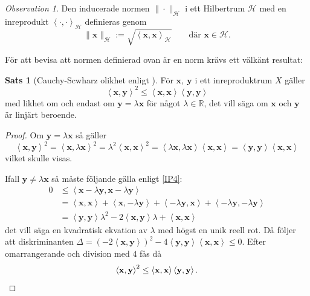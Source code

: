 \documentclass[a4paper, 12pt]{report}
\theoremstyle{definition}
\newtheorem{thm}{Sats}[section]
\theoremstyle{remark}
\newtheorem*{rem}{Observation}
\newcommand{\bfx}{\mathbf{x}}
\newcommand{\llangle}{\left\langle}
\newcommand{\rrangle}{\right\rangle}
\begin{document}
\begin{rem}
	Den inducerade normen $\|\cdot\|_\mathcal{H}$ i ett Hilbertrum $\mathcal{H}$ med en inreprodukt $\llangle \cdot, \cdot\rrangle_\mathcal{H}$ definieras genom
	\begin{equation*}
		\| \mathbf{x}\|_\mathcal{H} := \sqrt{\llangle \bfx, \bfx \rrangle_\mathcal{H}} \qquad \text{där } \bfx \in \mathcal{H}.
	\end{equation*}
\end{rem}
För att bevisa att normen definierad ovan är en norm krävs ett välkänt resultat:
\begin{thm}[Cauchy-Scwharz olikhet enligt \cite{Young}]\label{CauchySchwarz}
	För $\bfx,~\mathbf{y}$ i ett inreproduktrum $X$ gäller
	\begin{equation*}
	\llangle\bfx, \mathbf{y}\rrangle^2 \leq \llangle\bfx, \bfx \rrangle \llangle \mathbf{y}, \mathbf{y} \rrangle
	\end{equation*}
	med likhet om och endast om $\mathbf{y} = \lambda \bfx$ för något $\lambda \in \mathbb{R}$, det vill säga om $\bfx$ och $\mathbf{y}$ är linjärt beroende.
\end{thm}
\begin{proof}
	Om $\mathbf{y} = \lambda \bfx$ så gäller
	\begin{equation*}
	\llangle\bfx, \mathbf{y}\rrangle^2 = \llangle\bfx, \lambda \bfx\rrangle^2 = \lambda^2\llangle\bfx, \bfx\rrangle^2 = \llangle \lambda\bfx, \lambda\bfx \rrangle\llangle \bfx, \bfx \rrangle = \llangle \mathbf{y}, \mathbf{y} \rrangle\llangle \bfx, \bfx \rrangle
	\end{equation*}
	vilket skulle visas.
	
	Ifall $\mathbf{y} \neq \lambda \bfx$ så måste följande gälla enligt \ref{IP4}:
	\begin{align*}
	0 &\leq\llangle \bfx - \lambda\mathbf{y} , \bfx - \lambda\mathbf{y} \rrangle\\
	&= \llangle \bfx, \bfx \rrangle + \llangle \bfx , - \lambda \mathbf{y} \rrangle + \llangle - \lambda \mathbf{y} , \bfx \rrangle + \llangle -\lambda\mathbf{y}, -\lambda\mathbf{y}\rrangle\\
	&=  \llangle\mathbf{y}, \mathbf{y} \rrangle \lambda^2 - 2 \llangle \bfx, \mathbf{y}\rrangle \lambda + \llangle \bfx, \bfx \rrangle
	\end{align*}
	det vill säga en kvadratisk ekvation av $\lambda$ med högst en unik reell rot. Då följer att diskriminanten $\Delta=\left(-2\llangle\bfx,\mathbf{y}\rrangle\right)^2 - 4 \llangle \mathbf{y}, \mathbf{y}\rrangle\llangle\bfx,\bfx\rrangle\leq0$. Efter omarrangerande och division med $4$ fås då
	\begin{equation*}
	\llangle \bfx, \mathbf{y}\rrangle^2 \leq \llangle \bfx, \bfx \rrangle \llangle \mathbf{y}, \mathbf{y} \rrangle. \qedhere
	\end{equation*}
\end{proof}
\end{document}
